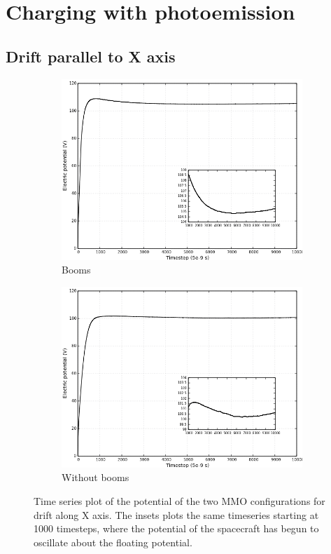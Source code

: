 \section{Charging with photoemission}

\subsection*{Drift parallel to X axis}

\begin{figure}[H]
  \centering
  \begin{subfigure}[b]{0.75\textwidth}
  \includegraphics[width=\columnwidth]{figures/MMO/posX/WB/C_posX_WB.png}
  \caption{Booms}
  \label{fig:C_posX_WB}
\end{subfigure}
\hfill
\begin{subfigure}[b]{0.75\textwidth}
  \includegraphics[width=\columnwidth]{figures/MMO/posX/NB/C_posX_NB.png}
  \caption{Without booms}
  \label{fig:C_posX_NB}
\end{subfigure}
\label{fig:Conv_posX}
\caption{Time series plot of the potential of the two MMO configurations for drift along X axis. The insets plots the same timeseries starting at 1000 timesteps, where the potential of the spacecraft has begun to oscillate about the floating potential.}
\end{figure}


